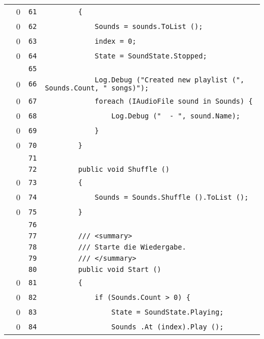 \documentclass[a4paper,10pt]{article}
\begin{document}
\begin{longtable}[l]{lrrl}
\cellcolor{red} & 0 & \verb~61~ & \verb~        {~\\
\cellcolor{red} & 0 & \verb~62~ & \verb~            Sounds = sounds.ToList ();~\\
\cellcolor{red} & 0 & \verb~63~ & \verb~            index = 0;~\\
\cellcolor{red} & 0 & \verb~64~ & \verb~            State = SoundState.Stopped;~\\
\cellcolor{gray} &  & \verb~65~ & \verb~~\\
\cellcolor{red} & 0 & \verb~66~ & \verb~            Log.Debug ("Created new playlist (", Sounds.Count, " songs)");~\\
\cellcolor{red} & 0 & \verb~67~ & \verb~            foreach (IAudioFile sound in Sounds) {~\\
\cellcolor{red} & 0 & \verb~68~ & \verb~                Log.Debug ("  - ", sound.Name);~\\
\cellcolor{red} & 0 & \verb~69~ & \verb~            }~\\
\cellcolor{red} & 0 & \verb~70~ & \verb~        }~\\
\cellcolor{gray} &  & \verb~71~ & \verb~~\\
\cellcolor{gray} &  & \verb~72~ & \verb~        public void Shuffle ()~\\
\cellcolor{red} & 0 & \verb~73~ & \verb~        {~\\
\cellcolor{red} & 0 & \verb~74~ & \verb~            Sounds = Sounds.Shuffle ().ToList ();~\\
\cellcolor{red} & 0 & \verb~75~ & \verb~        }~\\
\cellcolor{gray} &  & \verb~76~ & \verb~~\\
\cellcolor{gray} &  & \verb~77~ & \verb~        /// <summary>~\\
\cellcolor{gray} &  & \verb~78~ & \verb~        /// Starte die Wiedergabe.~\\
\cellcolor{gray} &  & \verb~79~ & \verb~        /// </summary>~\\
\cellcolor{gray} &  & \verb~80~ & \verb~        public void Start ()~\\
\cellcolor{red} & 0 & \verb~81~ & \verb~        {~\\
\cellcolor{red} & 0 & \verb~82~ & \verb~            if (Sounds.Count > 0) {~\\
\cellcolor{red} & 0 & \verb~83~ & \verb~                State = SoundState.Playing;~\\
\cellcolor{red} & 0 & \verb~84~ & \verb~                Sounds .At (index).Play ();~\\

\end{longtable}
\end{document}
